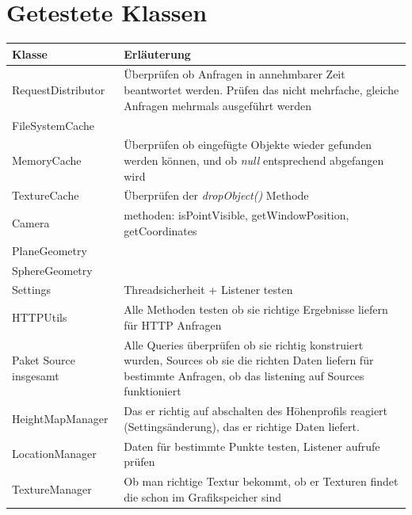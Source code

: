 \documentclass[10pt]{scrreprt}
\begin{document}
\section{Getestete Klassen}

\begin{tabular}{|p{4cm}|p{11cm}|}
\hline 
\rule[-1ex]{0pt}{4ex} \textbf{Klasse} & \textbf{Erläuterung} \\ 
\hline
\hline
\rule[-1ex]{0pt}{4ex} RequestDistributor & Überprüfen ob Anfragen in annehmbarer Zeit beantwortet werden. Prüfen das nicht mehrfache, gleiche Anfragen mehrmals ausgeführt werden \\ 
\hline
\rule[-1ex]{0pt}{4ex} FileSystemCache &  \\ 
\hline
\rule[-1ex]{0pt}{4ex} MemoryCache & Überprüfen ob eingefügte Objekte wieder gefunden werden können, und ob \textit{null} entsprechend abgefangen wird\\ 
\hline
\rule[-1ex]{0pt}{4ex} TextureCache & Überprüfen der \textit{dropObject()} Methode\\ 
\hline
\rule[-1ex]{0pt}{4ex} Camera & methoden: isPointVisible, getWindowPosition, getCoordinates \\ 
\hline
\rule[-1ex]{0pt}{4ex} PlaneGeometry & \\ 
\hline
\rule[-1ex]{0pt}{4ex} SphereGeometry & \\ 
\hline
\rule[-1ex]{0pt}{4ex} Settings & Threadsicherheit + Listener testen \\ 
\hline
\rule[-1ex]{0pt}{4ex} HTTPUtils & Alle Methoden testen ob sie richtige Ergebnisse liefern für HTTP Anfragen\\ 
\hline
\rule[-1ex]{0pt}{4ex} Paket Source insgesamt & Alle Queries überprüfen ob sie richtig konstruiert wurden, Sources ob sie die richten Daten liefern für bestimmte Anfragen, ob das listening auf Sources funktioniert\\ 
\hline
\rule[-1ex]{0pt}{4ex} HeightMapManager & Das er richtig auf abschalten des Höhenprofils reagiert (Settingsänderung), das er richtige Daten liefert. \\ 
\hline
\rule[-1ex]{0pt}{4ex} LocationManager & Daten für bestimmte Punkte testen, Listener aufrufe prüfen \\ 
\hline
\rule[-1ex]{0pt}{4ex} TextureManager & Ob man richtige Textur bekommt, ob er Texturen findet die schon im Grafikspeicher sind \\ 
\hline

\end{tabular}
\end{document}
